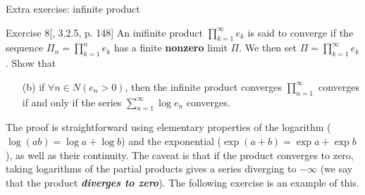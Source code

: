 {\Large Extra exercise: infinite product}\vspace{1em}

\begin{thing4}{Exercise 8}[\cite{zo1}, 3.2.5, p. 148]\leavevmode
An inifinite product $\prod_{k=1}^\infty e_k$ is said to converge if the sequence $\Pi_n=\prod_{k=1}^n e_k$ has a finite \textbf{nonzero} limit $\Pi$. We then set $\Pi=\prod_{k=1}^\infty e_k$. Show that
\begin{enumerate}[label=(\alph*)]
	\item[(b)]  if $\forall n \in N (e_n>0)$, then the infinite product converges $\prod_{n=1}^\infty$ converges if and only if the series  $\sum_{n=1}^\infty \operatorname{log}e_n$ converges.
\end{enumerate}
\end{thing4}

\begin{remark}\leavevmode
The proof is straightforward using elementary properties of the logarithm ($\operatorname{log}(ab)=\operatorname{log}a+\operatorname{log}b$) and the exponential ($\operatorname{exp}(a+b)=\operatorname{exp}a+\operatorname{exp}b$), as well as their continuity. The caveat is that if the product converges to zero, taking logarithms of the partial products gives a series diverging to $-\infty$ (we say that the product \textit{\textbf{diverges to zero}}). The following exercise is an example of this.
\end{remark}

